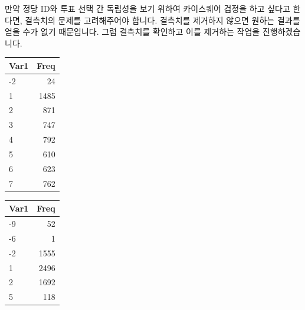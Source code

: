 \documentclass[]{book}
\newenvironment{Shaded}{\begin{snugshade}}{\end{snugshade}}
\newcommand{\CommentTok}[1]{\textcolor[rgb]{0.56,0.35,0.01}{\textit{#1}}}
\newcommand{\KeywordTok}[1]{\textcolor[rgb]{0.13,0.29,0.53}{\textbf{#1}}}
\newcommand{\NormalTok}[1]{#1}
\newcommand{\OperatorTok}[1]{\textcolor[rgb]{0.81,0.36,0.00}{\textbf{#1}}}
\newcommand{\StringTok}[1]{\textcolor[rgb]{0.31,0.60,0.02}{#1}}
\begin{document}
만약 정당 ID와 투표 선택 간 독립성을 보기 위하여 카이스퀘어 검정을 하고 싶다고 한다면, 결측치의 문제를 고려해주어야 합니다. 결측치를 제거하지 않으면 원하는 결과를 얻을 수가 없기 때문입니다. 그럼 결측치를 확인하고 이를 제거하는 작업을 진행하겠습니다.

\begin{Shaded}
\end{Shaded}

\begin{tabular}{l|r}
\hline
Var1 & Freq\\
\hline
-2 & 24\\
\hline
1 & 1485\\
\hline
2 & 871\\
\hline
3 & 747\\
\hline
4 & 792\\
\hline
5 & 610\\
\hline
6 & 623\\
\hline
7 & 762\\
\hline
\end{tabular}

\begin{Shaded}
\end{Shaded}

\begin{tabular}{l|r}
\hline
Var1 & Freq\\
\hline
-9 & 52\\
\hline
-6 & 1\\
\hline
-2 & 1555\\
\hline
1 & 2496\\
\hline
2 & 1692\\
\hline
5 & 118\\
\hline
\end{tabular}
\end{document}
